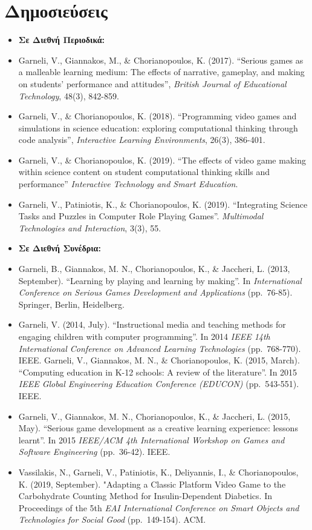 \documentclass[%
    11pt,
  oneside
  ]{memoir}
\let\oldsection\section
\renewcommand{\section}[1]{%
  \oldsection{#1}
  \leavevmode
  \par
  \vspace{\dimexpr-\baselineskip-\parskip}
}
\begin{document}
\hypertarget{ux3b4ux3b7ux3bcux3bfux3c3ux3b9ux3b5ux3cdux3c3ux3b5ux3b9ux3c2}{%
\section{Δημοσιεύσεις}\label{ux3b4ux3b7ux3bcux3bfux3c3ux3b9ux3b5ux3cdux3c3ux3b5ux3b9ux3c2}}

\begin{itemize}
\tightlist
\item
  \textbf{Σε Διεθνή Περιοδικά:}
\item
  Garneli, V., Giannakos, M., \& Chorianopoulos, K. (2017). ``Serious
  games as a malleable learning medium: The effects of narrative,
  gameplay, and making on students' performance and attitudes'',
  \emph{British Journal of Educational Technology}, 48(3), 842-859.
\item
  Garneli, V., \& Chorianopoulos, K. (2018). ``Programming video games
  and simulations in science education: exploring computational thinking
  through code analysis'', \emph{Interactive Learning Environments},
  26(3), 386-401.
\item
  Garneli, V., \& Chorianopoulos, K. (2019). ``The effects of video game
  making within science content on student computational thinking skills
  and performance'' \emph{Interactive Technology and Smart Education}.
\item
  Garneli, V., Patiniotis, K., \& Chorianopoulos, K. (2019).
  ``Integrating Science Tasks and Puzzles in Computer Role Playing
  Games''. \emph{Multimodal Technologies and Interaction}, 3(3), 55.
\item
  \textbf{Σε Διεθνή Συνέδρια:}
\item
  Garneli, B., Giannakos, M. N., Chorianopoulos, K., \& Jaccheri, L.
  (2013, September). ``Learning by playing and learning by making''. In
  \emph{International Conference on Serious Games Development and
  Applications} (pp.~76-85). Springer, Berlin, Heidelberg.
\item
  Garneli, V. (2014, July). ``Instructional media and teaching methods
  for engaging children with computer programming''. In 2014 \emph{IEEE
  14th International Conference on Advanced Learning Technologies}
  (pp.~768-770). IEEE. Garneli, V., Giannakos, M. N., \& Chorianopoulos,
  K. (2015, March). ``Computing education in K-12 schools: A review of
  the literature''. In 2015 \emph{IEEE Global Engineering Education
  Conference (EDUCON)} (pp.~543-551). IEEE.\\
\item
  Garneli, V., Giannakos, M. N., Chorianopoulos, K., \& Jaccheri, L.
  (2015, May). ``Serious game development as a creative learning
  experience: lessons learnt''. In 2015 \emph{IEEE/ACM 4th International
  Workshop on Games and Software Engineering} (pp.~36-42). IEEE.
\item
  Vassilakis, N., Garneli, V., Patiniotis, K., Deliyannis, I., \&
  Chorianopoulos, K. (2019, September). "Adapting a Classic Platform
  Video Game to the Carbohydrate Counting Method for Insulin-Dependent
  Diabetics. In Proceedings of the 5th \emph{EAI International
  Conference on Smart Objects and Technologies for Social Good}
  (pp.~149-154). ACM.
\end{itemize}
\end{document}
